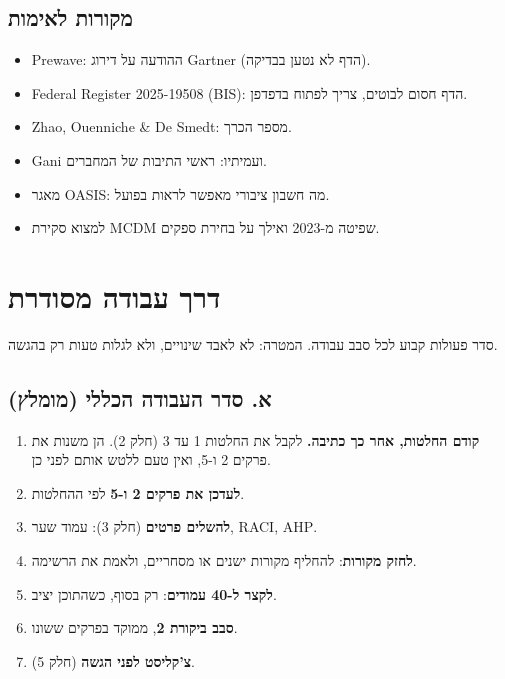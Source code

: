 \documentclass[11pt,a4paper]{article}
\newcommand{\en}[1]{\foreignlanguage{english}{#1}}
\newcommand{\cb}{\framebox[1.7ex]{\rule{0pt}{1.3ex}}}
\newenvironment{checks}{\begin{itemize}\renewcommand{\labelitemi}{\cb}}{\end{itemize}}
\begin{document}
\subsection*{מקורות לאימות}
\begin{checks}
\item \en{Prewave}: ההודעה על דירוג \en{Gartner} (הדף לא נטען בבדיקה).
\item \en{Federal Register 2025-19508} (\en{BIS}): הדף חסום לבוטים, צריך לפתוח בדפדפן.
\item \en{Zhao, Ouenniche \& De Smedt}: מספר הכרך.
\item \en{Gani} ועמיתיו: ראשי התיבות של המחברים.
\item מאגר \en{OASIS}: מה חשבון ציבורי מאפשר לראות בפועל.
\item למצוא סקירת \en{MCDM} שפיטה מ-2023 ואילך על בחירת ספקים.
\end{checks}

\section{דרך עבודה מסודרת}
סדר פעולות קבוע לכל סבב עבודה. המטרה: לא לאבד שינויים, ולא לגלות טעות רק בהגשה.

\subsection*{א. סדר העבודה הכללי (מומלץ)}
\begin{enumerate}
\item \textbf{קודם החלטות, אחר כך כתיבה.} לקבל את החלטות 1 עד 3 (חלק 2). הן משנות את פרקים 2 ו-5, ואין טעם ללטש אותם לפני כן.
\item \textbf{לעדכן את פרקים 2 ו-5} לפי ההחלטות.
\item \textbf{להשלים פרטים} (חלק 3): עמוד שער, \en{RACI}, \en{AHP}.
\item \textbf{לחזק מקורות}: להחליף מקורות ישנים או מסחריים, ולאמת את הרשימה.
\item \textbf{לקצר ל-40 עמודים}: רק בסוף, כשהתוכן יציב.
\item \textbf{סבב ביקורת 2}, ממוקד בפרקים ששונו.
\item \textbf{צ'קליסט לפני הגשה} (חלק 5).
\end{enumerate}
\end{document}

